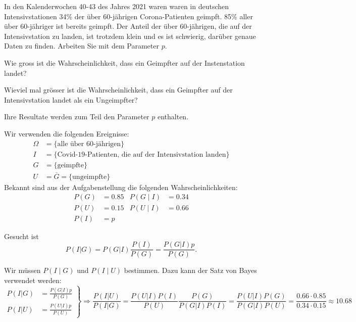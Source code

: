 In den Kalenderwochen 40-43 des Jahres 2021
waren waren in deutschen Intensivstationen
34\% der über 60-jährigen Corona-Patienten geimpft.
85\% aller über 60-jähriger ist bereits geimpft.
Der Anteil der über 60-jährigen, die auf der Intensivstation zu landen,
ist trotzdem klein und es ist schwierig, darüber genaue Daten zu finden.
Arbeiten Sie mit dem Parameter $p$.
\begin{teilaufgaben}
\item 
Wie gross ist die Wahrscheinlichkeit, dass ein Geimpfter auf der
Instenstation landet?
\item
Wieviel mal grösser ist die Wahrscheinlichkeit, dass ein Geimpfter
auf der Intensivstation landet als ein Ungeimpfter?
\end{teilaufgaben}


\begin{hinweis}
Ihre Resultate werden zum Teil den Parameter $p$ enthalten.
\end{hinweis}

\begin{loesung}
Wir verwenden die folgenden Ereignisse:
\begin{align*}
\Omega&=\{\text{alle über 60-jährigen}\}
\\
I&=\{\text{Covid-19-Patienten, die auf der Intensivstation landen}\}
\\
G&=\{\text{geimpfte}\}
\\
U&=\overline{G}=\{\text{ungeimpfte}\}
\end{align*}
Bekannt sind aus der Aufgabenstellung die folgenden Wahrscheinlichkeiten:
\begin{align*}
P(G)       &= 0.85 &
P(G\mid I) &= 0.34 \\
P(U)       &= 0.15 &
P(U\mid I) &= 0.66 \\
P(I)       &= p
\end{align*}
\begin{teilaufgaben}
\item
Gesucht ist
\[
P(I|G)
=
P(G|I) \frac{P(I)}{P(G)}
=
\frac{P(G|I)p}{P(G)}.
\]
\item
Wir müssen $P(I\mid G)$ und $P(I\mid U)$ bestimmen.
Dazu kann der Satz von Bayes verwendet werden:
\[
\left.
\begin{aligned}
P(I|G) &= \frac{P(G|I)p}{P(G)}
\\
P(I|U) &= \frac{P(U|I)p}{P(U)}
\end{aligned}
\right\}
\Rightarrow
\frac{P(I|U)}{P(I|G)}
=
\frac{P(U|I)P(I)}{P(U)} \frac{P(G)}{P(G|I)P(I)}
=
\frac{P(U|I)P(G)}{P(G|I)P(U)}
=
\frac{0.66\cdot 0.85}{0.34\cdot 0.15}
\approx
10.68
\]
\end{teilaufgaben}
\end{loesung}


